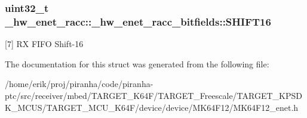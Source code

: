 \subsubsection[{\texorpdfstring{S\+H\+I\+F\+T16}{SHIFT16}}]{\setlength{\rightskip}{0pt plus 5cm}uint32\+\_\+t \+\_\+hw\+\_\+enet\+\_\+racc\+::\+\_\+hw\+\_\+enet\+\_\+racc\+\_\+bitfields\+::\+S\+H\+I\+F\+T16}\hypertarget{struct__hw__enet__racc_1_1__hw__enet__racc__bitfields_af64b439b5aa8010e18d6db3c5e0676bd}{}\label{struct__hw__enet__racc_1_1__hw__enet__racc__bitfields_af64b439b5aa8010e18d6db3c5e0676bd}
\mbox{[}7\mbox{]} RX F\+I\+FO Shift-\/16 

The documentation for this struct was generated from the following file\+:\begin{DoxyCompactItemize}
\item 
/home/erik/proj/piranha/code/piranha-\/ptc/src/receiver/mbed/\+T\+A\+R\+G\+E\+T\+\_\+\+K64\+F/\+T\+A\+R\+G\+E\+T\+\_\+\+Freescale/\+T\+A\+R\+G\+E\+T\+\_\+\+K\+P\+S\+D\+K\+\_\+\+M\+C\+U\+S/\+T\+A\+R\+G\+E\+T\+\_\+\+M\+C\+U\+\_\+\+K64\+F/device/device/\+M\+K64\+F12/M\+K64\+F12\+\_\+enet.\+h\end{DoxyCompactItemize}
